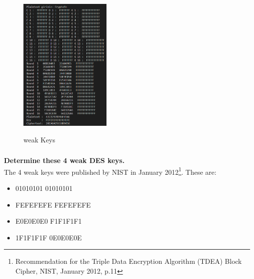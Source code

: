 \documentclass[11pt]{article}
\begin{document}
\begin{figure}[ht!]
    {\includegraphics[width=0.4\textwidth]{Screenshot_3.png}}\quad
  \caption{weak Keys}
  \label{fig:Weak keys}
\end{figure}


\clearpage
\subsubsection{}\textbf{Determine these 4 weak DES keys.}\\

The 4 weak keys were published by NIST in January 2012\footnote{Recommendation for the Triple Data Encryption Algorithm (TDEA)
Block Cipher, NIST, January 2012, p.11}. These are:\\
\begin{itemize}
  \item 01010101 01010101
  \item FEFEFEFE FEFEFEFE
  \item E0E0E0E0 F1F1F1F1
  \item 1F1F1F1F 0E0E0E0E
\end{itemize}
\end{document}
